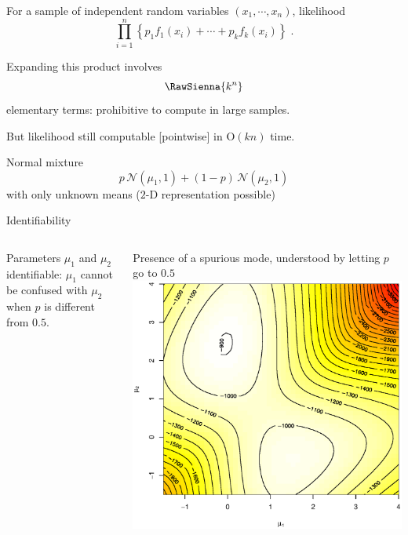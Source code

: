 \begin{slide}
\end{slide}\begin{slide}

For a sample of independent random variables $(x_{1},\cdots,x_{n})$, likelihood
$$
\prod_{i=1}^n \left\{ p_{1} f_{1}(x_i) +\cdots+ p_{k} f_{k}(x_i) \right\} \;. 
$$

\vs\pause
Expanding this product involves 
$$
\RawSienna{k^{n}}
$$
elementary terms: prohibitive to compute in large samples.  

But likelihood still computable [pointwise] in $\text{O}(kn)$ time.
 
\end{slide}\begin{slide}

Normal mixture
$$
p\,\mathscr{N}(\mu_1,1)+(1-p)\,\mathscr{N}(\mu_2,1)
$$
with only unknown means ($2$-D representation possible)

\begin{block}{Identifiability}
\begin{columns}\small
Parameters $\mu_1$ and $\mu_2$ identifiable: $\mu_1$ cannot be confused with $\mu_2$ when
$p$ is different from $0.5$.

Presence of a spurious mode, understood by letting $p$ go to $0.5$\normalsize
{}
\includegraphics[width=.75\textwidth,height=.4\textheight]{figures/lvraisd1.eps}
\end{columns}
\end{block}

\end{slide}\begin{slide}


\end{slide}
